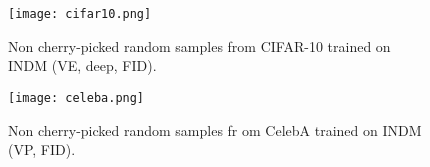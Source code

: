 \documentclass{article}
\theoremstyle{definition}
\theoremstyle{remark}
\begin{document}
	\begin{figure}
		\centering
		\texttt{[image: cifar10.png]}
		\caption{Non cherry-picked random samples from CIFAR-10 trained on INDM (VE, deep, FID).}
		\label{fig:CIFAR10_VE_FID_samples_tau_1.05}
	\end{figure}
	
	\begin{figure}
		\centering
		\texttt{[image: celeba.png]}
		\caption{Non cherry-picked random samples fr om CelebA trained on INDM (VP, FID).}
		\label{fig:CelebA_VP_FID_samples_tau_1.11}
	\end{figure}
	


	
\end{document}
